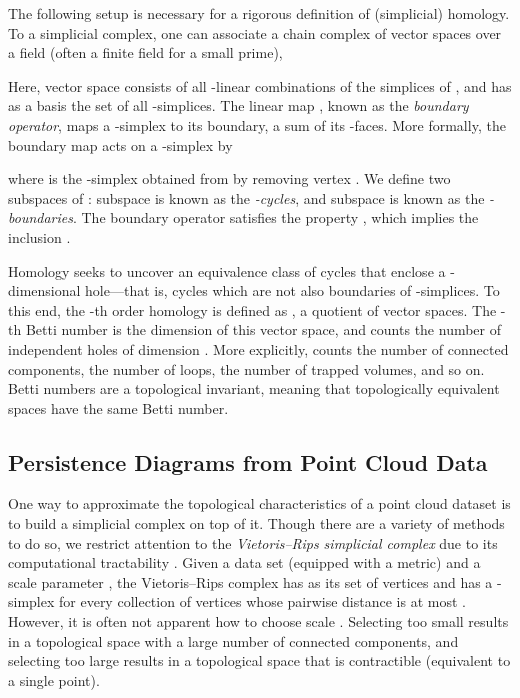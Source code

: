 \documentclass[11pt]{article}
\begin{document}
The following setup is necessary for a rigorous definition of (simplicial) homology. To a simplicial complex, one can associate a chain complex of vector spaces over a field  (often a finite field  for  a small prime), 

\noindent Here, vector space  consists of all -linear combinations of the  simplices of , and has as a basis the set of all -simplices. The linear map , known as the \emph{boundary operator}, maps a -simplex to its boundary, a sum of its -faces. More formally, the boundary map acts on a -simplex  by

where  is the -simplex obtained from  by removing vertex . We define two subspaces of : subspace  is known as the \emph{-cycles}, and subspace  is known as the \emph{-boundaries}. The boundary operator satisfies the property , which implies the inclusion .

Homology seeks to uncover an equivalence class of cycles that enclose a -dimensional hole---that is, cycles which are not also boundaries of -simplices. To this end, the -th order homology is defined as , a quotient of vector spaces. The -th Betti number  is the dimension of this vector space, and counts the number of independent holes of dimension . More explicitly,  counts the number of connected components,  the number of loops,  the number of trapped volumes, and so on. Betti numbers are a topological invariant, meaning that topologically equivalent spaces have the same Betti number.

\subsection{Persistence Diagrams from Point Cloud Data}\label{PD_Data}

One way to approximate the topological characteristics of a point cloud dataset is to build a simplicial complex on top of it. Though there are a variety of methods to do so, we restrict attention to the \emph{Vietoris--Rips simplicial complex} due to its computational tractability \citep{barcodes}. Given a data set  (equipped with a metric) and a scale parameter , the Vietoris--Rips complex  has  as its set of vertices and has a -simplex for every collection of  vertices whose pairwise distance is at most . However, it is often not apparent how to choose scale . Selecting  too small results in a topological space with a large number of connected components, and selecting  too large results in a topological space that is contractible (equivalent to a single point).
\end{document}
